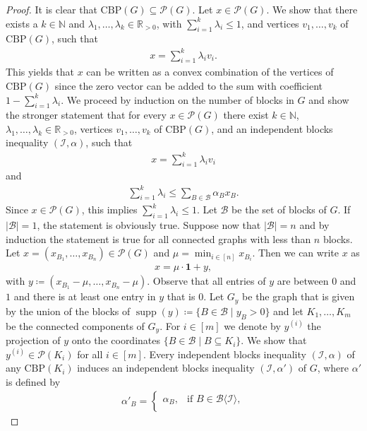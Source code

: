 \documentclass[10pt,a4paper]{amsart}
\DeclareMathOperator{\supp}{\mathrm{supp}}
\newcommand{\B}{\mathcal{B}}
\newcommand{\CBP}{\mathrm{CBP}}
\newcommand{\I}{\mathcal{I}}
\newcommand{\R}{\mathbb{R}}
\renewcommand{\P}{\mathcal{P}}
\begin{document}
\begin{proof}
    It is clear that $\CBP(G) \subseteq \P(G)$. Let $x \in \P(G)$. We show that there exists a $k \in \mathbb{N}$ and $\lambda_1,\ldots,\lambda_k \in \R_{>0}$, with $\sum_{i=1}^k \lambda_i \le 1$, and vertices $v_1,\ldots,v_k$ of $\CBP(G)$, such that
    \begin{align*}
        x=\sum_{i=1}^k \lambda_iv_i.
    \end{align*}
    This yields that $x$ can be written as a convex combination of the vertices of $\CBP(G)$ since the zero vector can be added to the sum with coefficient $1-\sum_{i=1}^k \lambda_i$. We proceed by induction on the number of blocks in $G$ and show the stronger statement that for every $x \in \P(G)$ there exist $k \in \mathbb{N}$, $\lambda_1,\ldots,\lambda_k \in \R_{>0}$, vertices $v_1,\ldots,v_k$ of $\CBP(G)$, and an independent blocks inequality $(\I,\alpha)$, such that
    \begin{align*}
        x=\sum_{i=1}^k \lambda_iv_i
    \end{align*}
    and
    \begin{align*}
        \sum_{i=1}^k \lambda_i \le \sum_{B \in \B}\alpha_Bx_B.
    \end{align*}
    Since $x \in \P(G)$, this implies $\sum_{i=1}^k \lambda_i \le 1$. Let $\B$ be the set of blocks of $G$. If $\vert \B \vert=1$, the statement is obviously true. Suppose now that $\vert \B \vert=n$ and by induction the statement is true for all connected graphs with less than $n$ blocks. Let $x=(x_{B_1},\ldots,x_{B_n}) \in \P(G)$ and $\mu=\min_{i \in [n]}x_{B_i}$. Then we can write $x$ as
    \begin{align*}
        x=\mu \cdot \mathbf{1}+y,
    \end{align*}
    with $y\coloneqq (x_{B_1}-\mu,\ldots,x_{B_n}-\mu)$. Observe that all entries of $y$ are between $0$ and $1$ and there is at least one entry in $y$ that is $0$. Let $G_y$ be the graph that is given by the union of the blocks of $\supp(y)\coloneqq \{B \in \B \mid y_B > 0\}$ and let $K_1,\ldots,K_m$ be the connected components of $G_y$. For $i\in [m]$ we denote by $y^{(i)}$ the projection of $y$ onto the coordinates $\{B \in \B \mid B \subseteq K_i\}$. We show that $y^{(i)} \in \P(K_i)$ for all $i \in [m]$. Every independent blocks inequality $(\I,\alpha)$ of any $\CBP(K_i)$ induces an independent blocks inequality $(\I,\alpha')$ of $G$, where $\alpha'$ is defined by
    \begin{align*}
        \alpha'_B=\begin{cases}\alpha_B, & \text{if } B \in \B\langle\I\rangle, \\

\end{cases}
\end{align*}
\end{proof}
\end{document}
